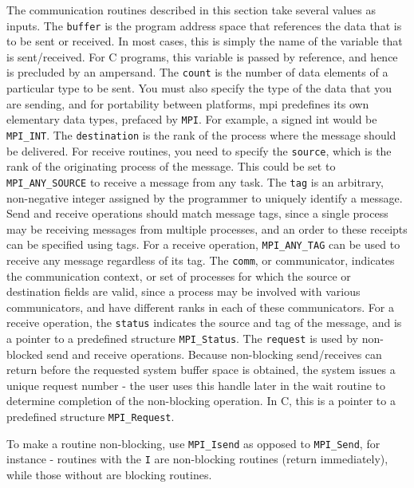 \documentclass[10pt]{article}
\begin{document}
\begin{flushleft}
The communication routines described in this section take several values as inputs. The {\tt buffer} is the program address space that references the data that is to be sent or received. In most cases, this is simply the name of the variable that is sent/received. For C programs, this variable is passed by reference, and hence is precluded by an ampersand. The {\tt count} is the number of data elements of a particular type to be sent. You must also specify the type of the data that you are sending, and for portability between platforms, \gls{mpi} predefines its own elementary data types, prefaced by {\tt MPI}. For example, a signed int would be {\tt MPI\_INT}. The {\tt destination} is the rank of the process where the message should be delivered. For receive routines, you need to specify the {\tt source}, which is the rank of the originating process of the message. This could be set to {\tt MPI\_ANY\_SOURCE} to receive a message from any task. The {\tt tag} is an arbitrary, non-negative integer assigned by the programmer to uniquely identify a message. Send and receive operations should match message tags, since a single process may be receiving messages from multiple processes, and an order to these receipts can be specified using tags. For a receive operation, {\tt MPI\_ANY\_TAG} can be used to receive any message regardless of its tag. The {\tt comm}, or communicator, indicates the communication context, or set of processes for which the source or destination fields are valid, since a process may be involved with various communicators, and have different ranks in each of these communicators. For a receive operation, the {\tt status} indicates the source and tag of the message, and is a pointer to a predefined structure {\tt MPI\_Status}. The {\tt request} is used by non-blocked send and receive operations. Because non-blocking send/receives can return before the requested system buffer space is obtained, the system issues a unique request number - the user uses this handle later in the wait routine to determine completion of the non-blocking operation. In C, this is a pointer to a predefined structure {\tt MPI\_Request}. 

To make a routine non-blocking, use {\tt MPI\_Isend} as opposed to {\tt MPI\_Send}, for instance - routines with the {\tt I} are non-blocking routines (return immediately), while those without are blocking routines.


\end{flushleft}
\end{document}
